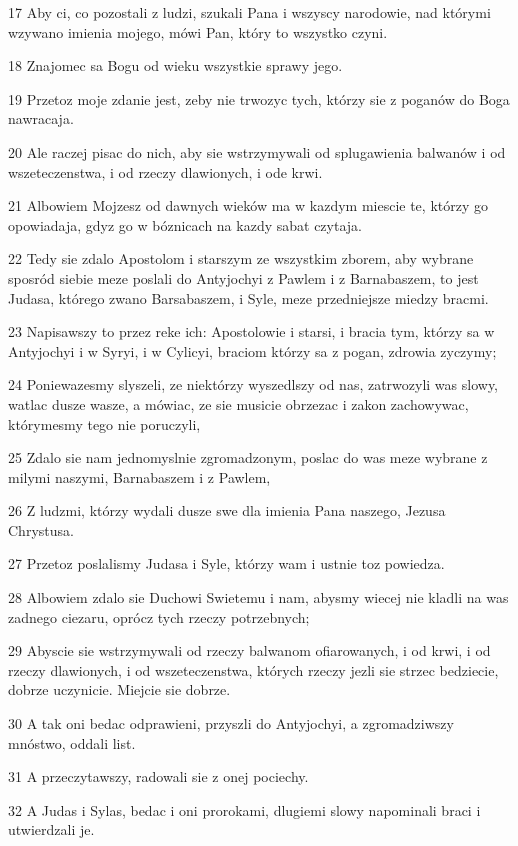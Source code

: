 \par 17 Aby ci, co pozostali z ludzi, szukali Pana i wszyscy narodowie, nad którymi wzywano imienia mojego, mówi Pan, który to wszystko czyni.
\par 18 Znajomec sa Bogu od wieku wszystkie sprawy jego.
\par 19 Przetoz moje zdanie jest, zeby nie trwozyc tych, którzy sie z poganów do Boga nawracaja.
\par 20 Ale raczej pisac do nich, aby sie wstrzymywali od splugawienia balwanów i od wszeteczenstwa, i od rzeczy dlawionych, i ode krwi.
\par 21 Albowiem Mojzesz od dawnych wieków ma w kazdym miescie te, którzy go opowiadaja, gdyz go w bóznicach na kazdy sabat czytaja.
\par 22 Tedy sie zdalo Apostolom i starszym ze wszystkim zborem, aby wybrane sposród siebie meze poslali do Antyjochyi z Pawlem i z Barnabaszem, to jest Judasa, którego zwano Barsabaszem, i Syle, meze przedniejsze miedzy bracmi.
\par 23 Napisawszy to przez reke ich: Apostolowie i starsi, i bracia tym, którzy sa w Antyjochyi i w Syryi, i w Cylicyi, braciom którzy sa z pogan, zdrowia zyczymy;
\par 24 Poniewazesmy slyszeli, ze niektórzy wyszedlszy od nas, zatrwozyli was slowy, watlac dusze wasze, a mówiac, ze sie musicie obrzezac i zakon zachowywac, którymesmy tego nie poruczyli,
\par 25 Zdalo sie nam jednomyslnie zgromadzonym, poslac do was meze wybrane z milymi naszymi, Barnabaszem i z Pawlem,
\par 26 Z ludzmi, którzy wydali dusze swe dla imienia Pana naszego, Jezusa Chrystusa.
\par 27 Przetoz poslalismy Judasa i Syle, którzy wam i ustnie toz powiedza.
\par 28 Albowiem zdalo sie Duchowi Swietemu i nam, abysmy wiecej nie kladli na was zadnego ciezaru, oprócz tych rzeczy potrzebnych;
\par 29 Abyscie sie wstrzymywali od rzeczy balwanom ofiarowanych, i od krwi, i od rzeczy dlawionych, i od wszeteczenstwa, których rzeczy jezli sie strzec bedziecie, dobrze uczynicie. Miejcie sie dobrze.
\par 30 A tak oni bedac odprawieni, przyszli do Antyjochyi, a zgromadziwszy mnóstwo, oddali list.
\par 31 A przeczytawszy, radowali sie z onej pociechy.
\par 32 A Judas i Sylas, bedac i oni prorokami, dlugiemi slowy napominali braci i utwierdzali je.
